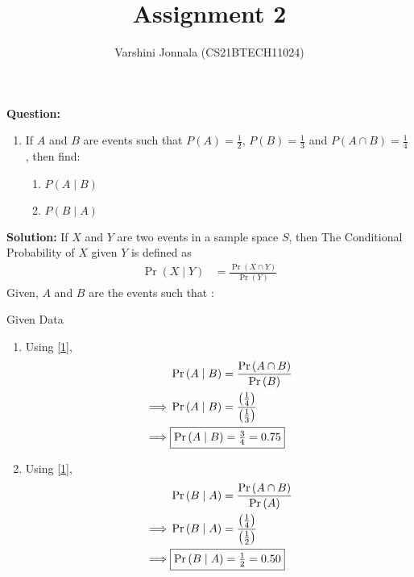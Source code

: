 \documentclass[journal,12pt,twocolumn]{IEEEtran}
\title{Assignment 2}
\author{Varshini Jonnala (CS21BTECH11024)}
\providecommand{\pr}[1]{\ensuremath{\Pr\left(#1\right)}}
\providecommand{\brak}[1]{\ensuremath{\left(#1\right)}}
\newcommand{\question}{\noindent \textbf{Question: }}
\newcommand{\solution}{\noindent \textbf{Solution: }}
\begin{document}
    \maketitle  
    
    \question
    \begin{enumerate}[label=]
        \item  If $A$ and $B$ are events such that $P(A) = \frac{1}{2}$, $P(B)= \frac{1}{3}$ and $P(A \cap B)= \frac{1}{4}$ , then find:
    \begin{enumerate}
        \item $P(A \mid B)$
        \item $P(B \mid A)$
    \end{enumerate}
    \end{enumerate}
    \solution 
     If $X$ and $Y$ are two events in a sample space $S$, then The Conditional Probability of $X$ given $Y$ is defined as
        \begin{align}
        \label{1}  \pr{X \mid Y} &= \frac{\pr{X \cap Y}}{\pr{Y}}  
        \end{align}
        Given, $A$ and $B$ are the events such that :
        \begin{table}[ht!]
            
        \caption{Given Data}
	        \label{Tables:Table}
        \end{table}
        \begin{enumerate}
            \item Using \eqref{1},
            \begin{align}
                &\pr{A \mid B} = \frac{\pr{A \cap B}}{\pr{B}}\\
                \implies &\pr{A \mid B} = {\frac{\brak{\frac{1}{4}}}{\brak{\frac{1}{3}}}}\\
                \implies &\fbox{$\pr{A \mid B} =\frac{3}{4} = 0.75$}
            \end{align}
            
            \item Using \eqref{1},
                \begin{align}
                &\pr{B \mid A} = \frac{\pr{A \cap B}}{\pr{A}}\\
                \implies &\pr{B \mid A} = {\frac{\brak{\frac{1}{4}}}{\brak{\frac{1}{2}}}}\\
                \implies &\fbox{$\pr{B \mid A} = \frac{1}{2} = 0.50$}
            \end{align} 
        \end{enumerate}
    
\end{document}
